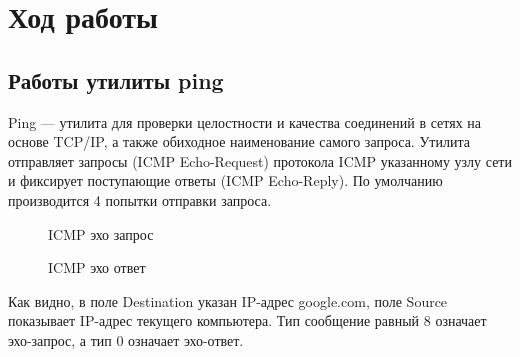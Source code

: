 \documentclass[a4paper, 14pt,russian]{article}
\begin{document}
\section{Ход работы}

\subsection{Работы утилиты ping}
	Ping — утилита для проверки целостности и качества соединений в сетях на основе TCP/IP, а также обиходное наименование самого запроса.	Утилита отправляет запросы (ICMP Echo-Request) протокола ICMP указанному узлу сети и фиксирует поступающие ответы (ICMP Echo-Reply). По умолчанию производится 4 попытки отправки запроса.

	\begin{figure}[h!]
		\caption{ICMP эхо запрос}
		\label{img:ping_req}
	\end{figure}

	\begin{figure}[h!]
		\caption{ICMP эхо ответ}
		\label{img:ping_ans}
	\end{figure}

	Как видно, в поле Destination указан IP-адрес google.com, поле Source показывает IP-адрес текущего компьютера.
	Тип сообщение равный 8 означает эхо-запрос, а тип 0 означает эхо-ответ.
	
\end{document}
